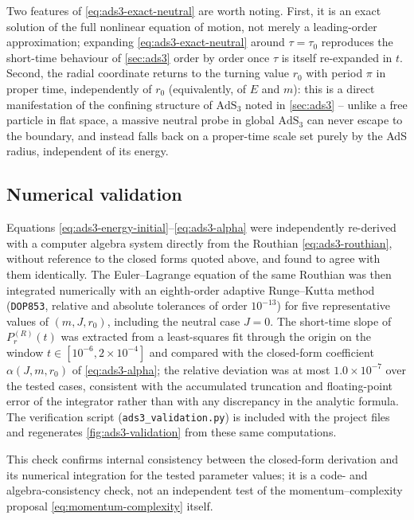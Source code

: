 \documentclass[11pt,a4paper]{article}
\theoremstyle{plain}
\theoremstyle{definition}
\theoremstyle{remark}
\newcommand{\PrR}{P_r^{(R)}}
\begin{document}
Two features of \eqref{eq:ads3-exact-neutral} are worth noting. First, it is an exact solution of the full nonlinear equation of motion, not merely a leading-order approximation; expanding \eqref{eq:ads3-exact-neutral} around $\tau=\tau_0$ reproduces the short-time behaviour of \cref{sec:ads3} order by order once $\tau$ is itself re-expanded in $t$. Second, the radial coordinate returns to the turning value $r_0$ with period $\pi$ in proper time, independently of $r_0$ (equivalently, of $E$ and $m$): this is a direct manifestation of the confining structure of $\mathrm{AdS}_3$ noted in \cref{sec:ads3} -- unlike a free particle in flat space, a massive neutral probe in global $\mathrm{AdS}_3$ can never escape to the boundary, and instead falls back on a proper-time scale set purely by the AdS radius, independent of its energy.

\subsection{Numerical validation}

Equations \eqref{eq:ads3-energy-initial}--\eqref{eq:ads3-alpha} were independently re-derived with a computer algebra system directly from the Routhian \eqref{eq:ads3-routhian}, without reference to the closed forms quoted above, and found to agree with them identically. The Euler--Lagrange equation of the same Routhian was then integrated numerically with an eighth-order adaptive Runge--Kutta method (\texttt{DOP853}, relative and absolute tolerances of order $10^{-13}$) for five representative values of $(m,J,r_0)$, including the neutral case $J=0$. The short-time slope of $\PrR(t)$ was extracted from a least-squares fit through the origin on the window $t\in[10^{-6},2\times10^{-4}]$ and compared with the closed-form coefficient $\alpha(J,m,r_0)$ of \eqref{eq:ads3-alpha}; the relative deviation was at most $1.0\times10^{-7}$ over the tested cases, consistent with the accumulated truncation and floating-point error of the integrator rather than with any discrepancy in the analytic formula. The verification script (\texttt{ads3\_validation.py}) is included with the project files and regenerates \cref{fig:ads3-validation} from these same computations.

This check confirms internal consistency between the closed-form derivation and its numerical integration for the tested parameter values; it is a code- and algebra-consistency check, not an independent test of the momentum--complexity proposal \eqref{eq:momentum-complexity} itself.
\end{document}
